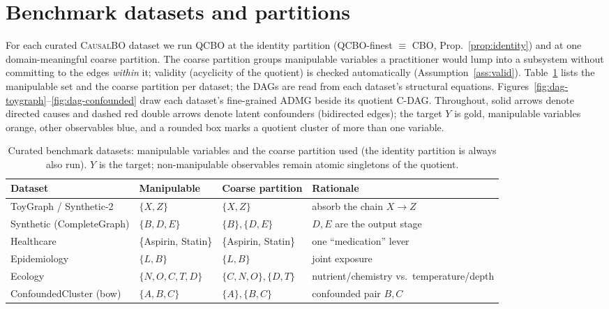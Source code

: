 \documentclass{article}
\newcommand{\QCBO}{\textsc{QCBO}}
\newcommand{\CBO}{\textsc{CBO}}
\begin{document}
\appendix

\section{Benchmark datasets and partitions}
\label{app:datasets}

For each curated \textsc{CausalBO} dataset we run \QCBO{} at the identity
partition (\QCBO{}-finest $\equiv$ \CBO{}, Prop.~\ref{prop:identity}) and at one
domain-meaningful coarse partition. The coarse partition groups manipulable
variables a practitioner would lump into a subsystem without committing to the
edges \emph{within} it; validity (acyclicity of the quotient) is checked
automatically (Assumption~\ref{ass:valid}). Table~\ref{tab:partitions} lists
the manipulable set and the coarse partition per dataset; the DAGs are read
from each dataset's structural equations.
Figures~\ref{fig:dag-toygraph}--\ref{fig:dag-confounded} draw each dataset's
fine-grained ADMG beside its quotient C-DAG. Throughout, solid arrows denote
directed causes and dashed red double arrows denote latent confounders
(bidirected edges); the target $Y$ is gold, manipulable variables orange, other
observables blue, and a rounded box marks a quotient cluster of more than one
variable.

\begin{table}[h]
  \centering
  \caption{Curated benchmark datasets: manipulable variables and the coarse
  partition used (the identity partition is always also run). $Y$ is the
  target; non-manipulable observables remain atomic singletons of the
  quotient.}
  \label{tab:partitions}
  \vspace{4pt}
  \small
  \begin{tabular}{@{}llll@{}}
    \toprule
    \textbf{Dataset} & \textbf{Manipulable} & \textbf{Coarse partition} &
    \textbf{Rationale} \\
    \midrule
    ToyGraph / Synthetic-2 & $\{X,Z\}$ & $\{X,Z\}$ & absorb the chain $X\to Z$ \\
    Synthetic (CompleteGraph) & $\{B,D,E\}$ & $\{B\},\{D,E\}$ & $D,E$ are the output stage \\
    Healthcare & \{Aspirin, Statin\} & \{Aspirin, Statin\} & one ``medication'' lever \\
    Epidemiology & $\{L,B\}$ & $\{L,B\}$ & joint exposure \\
    Ecology & $\{N,O,C,T,D\}$ & $\{C,N,O\},\{D,T\}$ & nutrient/chemistry vs.\ temperature/depth \\
    \midrule
    ConfoundedCluster (bow) & $\{A,B,C\}$ & $\{A\},\{B,C\}$ & confounded pair $B,C$ \\
    \bottomrule
  \end{tabular}
\end{table}
\end{document}
